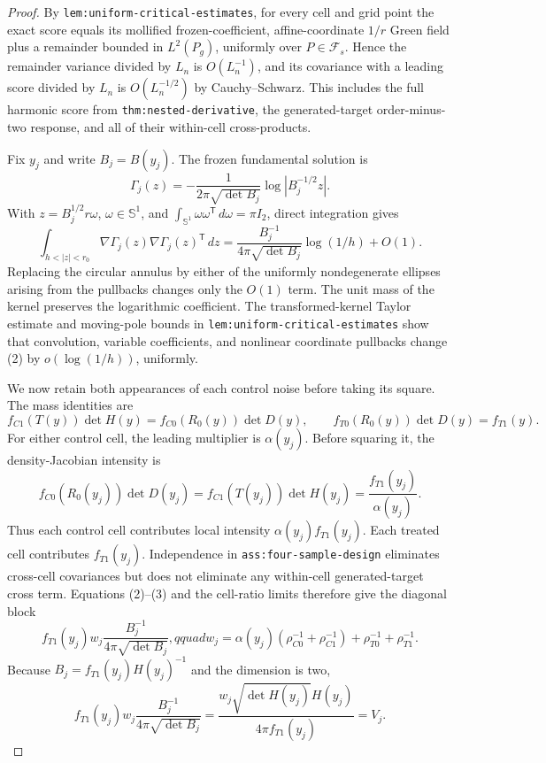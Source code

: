 \documentclass{article}
\begin{document}
\begin{proof}
By \texttt{lem:uniform-critical-estimates}, for every cell and grid point the exact score equals its mollified frozen-coefficient, affine-coordinate \(1/r\) Green field plus a remainder bounded in \(L^2(P_g)\), uniformly over \(P\in\mathcal F_s\).  Hence the remainder variance divided by \(L_n\) is \(O(L_n^{-1})\), and its covariance with a leading score divided by \(L_n\) is \(O(L_n^{-1/2})\) by Cauchy--Schwarz.  This includes the full harmonic score from \texttt{thm:nested-derivative}, the generated-target order-minus-two response, and all of their within-cell cross-products.

Fix \(y_j\) and write \(B_j=B(y_j)\).  The frozen fundamental solution is
\[
 \Gamma_j(z)=-\frac{1}{2\pi\sqrt{\det B_j}}
 \log|B_j^{-1/2}z|.                                                     \tag{1}
\]
With \(z=B_j^{1/2}r\omega\), \(\omega\in\mathbb S^1\), and
\(\int_{\mathbb S^1}\omega\omega^{\mathsf T}\,d\omega=\pi I_2\), direct integration gives
\[
 \int_{h<|z|<r_0}\nabla\Gamma_j(z)\nabla\Gamma_j(z)^{\mathsf T}\,dz
 =\frac{B_j^{-1}}{4\pi\sqrt{\det B_j}}\log(1/h)+O(1).                 \tag{2}
\]
Replacing the circular annulus by either of the uniformly nondegenerate ellipses arising from the pullbacks changes only the \(O(1)\) term.  The unit mass of the kernel preserves the logarithmic coefficient.  The transformed-kernel Taylor estimate and moving-pole bounds in \texttt{lem:uniform-critical-estimates} show that convolution, variable coefficients, and nonlinear coordinate pullbacks change (2) by \(o(\log(1/h))\), uniformly.

We now retain both appearances of each control noise before taking its square.  The mass identities are
\[
 f_{C1}(T(y))\det H(y)=f_{C0}(R_0(y))\det D(y),
 \qquad f_{T0}(R_0(y))\det D(y)=f_{T1}(y).                             \tag{3}
\]
For either control cell, the leading multiplier is \(\alpha(y_j)\).  Before squaring it, the density-Jacobian intensity is
\[
 f_{C0}(R_0(y_j))\det D(y_j)
 =f_{C1}(T(y_j))\det H(y_j)=\frac{f_{T1}(y_j)}{\alpha(y_j)}.
\]
Thus each control cell contributes local intensity \(\alpha(y_j)f_{T1}(y_j)\).  Each treated cell contributes \(f_{T1}(y_j)\).  Independence in \texttt{ass:four-sample-design} eliminates cross-cell covariances but does not eliminate any within-cell generated-target cross term.  Equations (2)--(3) and the cell-ratio limits therefore give the diagonal block
\[
 f_{T1}(y_j)w_j\frac{B_j^{-1}}{4\pi\sqrt{\det B_j}},qquad
 w_j=\alpha(y_j)(\rho_{C0}^{-1}+\rho_{C1}^{-1})
      +\rho_{T0}^{-1}+\rho_{T1}^{-1}.                                  \tag{4}
\]
Because \(B_j=f_{T1}(y_j)H(y_j)^{-1}\) and the dimension is two,
\[
 f_{T1}(y_j)w_j\frac{B_j^{-1}}{4\pi\sqrt{\det B_j}}
 =\frac{w_j\sqrt{\det H(y_j)}H(y_j)}{4\pi f_{T1}(y_j)}=V_j.          \tag{5}
\]


\end{proof}
\end{document}
